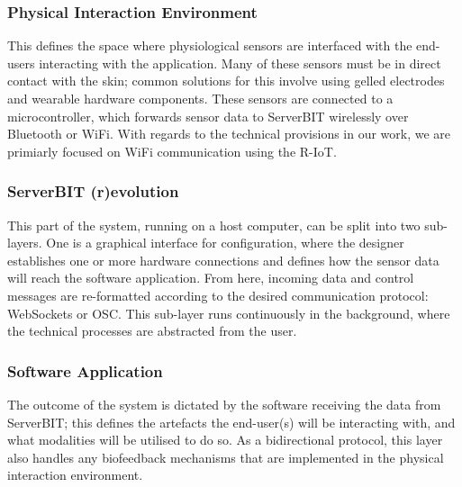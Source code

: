 \subsubsection*{Physical Interaction Environment}
This defines the space where physiological sensors are interfaced with the end-users interacting with the application. Many of these sensors must be in direct contact with the skin; common solutions for this involve using gelled electrodes and wearable hardware components. These sensors are connected to a microcontroller, which forwards sensor data to ServerBIT wirelessly over Bluetooth or WiFi. With regards to the technical provisions in our work, we are primiarly focused on WiFi communication using the R-IoT.

\subsubsection*{ServerBIT (r)evolution}
This part of the system, running on a host computer, can be split into two sub-layers. One is a graphical interface for configuration, where the designer establishes one or more hardware connections and defines how the sensor data will reach the software application. From here, incoming data and control messages are re-formatted according to the desired communication protocol: WebSockets or OSC. This sub-layer runs continuously in the background, where the technical processes are abstracted from the user.

\subsubsection*{Software Application}
The outcome of the system is dictated by the software receiving the data from ServerBIT; this defines the artefacts the end-user(s) will be interacting with, and what modalities will be utilised to do so.
As a bidirectional protocol, this layer also handles any biofeedback mechanisms that are implemented in the physical interaction environment.

